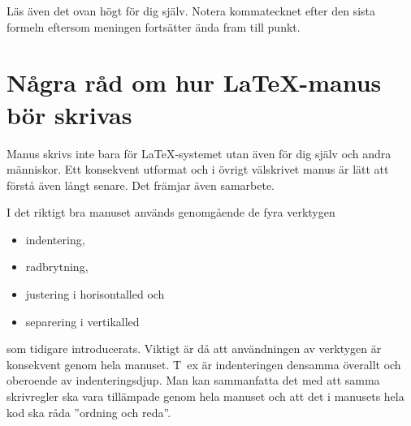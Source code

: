 \documentclass[a4paper,12pt]{article}
\begin{document}
Läs även det ovan högt för dig själv. Notera kommatecknet efter den
sista formeln eftersom meningen fortsätter ända fram till punkt. 

\section{Några råd om hur  \LaTeX-manus bör skrivas}
\label{sect:skrivregler}

Manus skrivs inte bara för LaTeX-systemet utan även för dig själv och
andra människor. Ett konsekvent utformat och i övrigt välskrivet manus
är lätt att förstå även långt senare. Det främjar även samarbete.

I det riktigt bra manuset används genomgående de fyra verktygen 
\begin{itemize}
  \item indentering,
  
  \item radbrytning,

  \item justering i horisontalled och

  \item separering i vertikalled
\end{itemize}
%
som tidigare introducerats. Viktigt är då att användningen av
verktygen är konsekvent genom hela manuset. T~ex är indenteringen
densamma överallt och oberoende av indenteringsdjup. Man kan
sammanfatta det med att samma skrivregler ska vara tillämpade genom
hela manuset och att det i manusets hela kod ska råda ''ordning och
reda''. 
\end{document}
